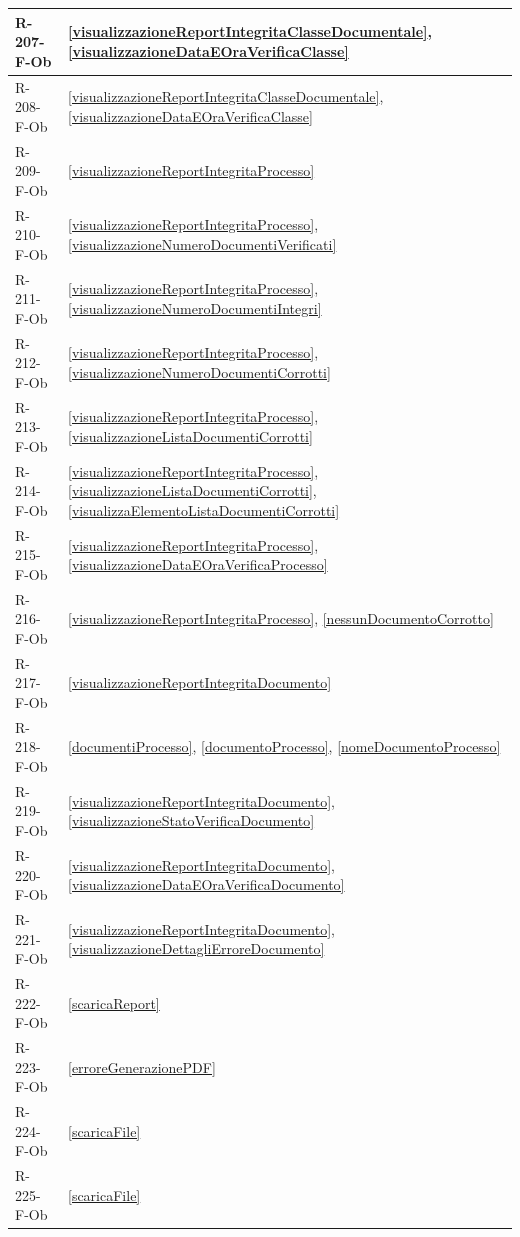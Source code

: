 \begin{longtable}{|p{4cm}|p{10cm}|}
\hline
R-207-F-Ob & \ref{visualizzazioneReportIntegritaClasseDocumentale}, \ref{visualizzazioneDataEOraVerificaClasse} \\
\hline
R-208-F-Ob & \ref{visualizzazioneReportIntegritaClasseDocumentale}, \ref{visualizzazioneDataEOraVerificaClasse} \\
\hline
R-209-F-Ob & \ref{visualizzazioneReportIntegritaProcesso} \\
\hline
R-210-F-Ob & \ref{visualizzazioneReportIntegritaProcesso}, \ref{visualizzazioneNumeroDocumentiVerificati} \\
\hline
R-211-F-Ob & \ref{visualizzazioneReportIntegritaProcesso}, \ref{visualizzazioneNumeroDocumentiIntegri} \\
\hline
R-212-F-Ob & \ref{visualizzazioneReportIntegritaProcesso}, \ref{visualizzazioneNumeroDocumentiCorrotti} \\
\hline
R-213-F-Ob & \ref{visualizzazioneReportIntegritaProcesso}, \ref{visualizzazioneListaDocumentiCorrotti} \\
\hline
R-214-F-Ob & \ref{visualizzazioneReportIntegritaProcesso}, \ref{visualizzazioneListaDocumentiCorrotti}, \ref{visualizzaElementoListaDocumentiCorrotti} \\
\hline
R-215-F-Ob & \ref{visualizzazioneReportIntegritaProcesso}, \ref{visualizzazioneDataEOraVerificaProcesso} \\
\hline
R-216-F-Ob & \ref{visualizzazioneReportIntegritaProcesso}, \ref{nessunDocumentoCorrotto} \\
\hline
R-217-F-Ob & \ref{visualizzazioneReportIntegritaDocumento} \\
\hline
R-218-F-Ob & \ref{documentiProcesso}, \ref{documentoProcesso}, \ref{nomeDocumentoProcesso} \\
\hline
R-219-F-Ob & \ref{visualizzazioneReportIntegritaDocumento}, \ref{visualizzazioneStatoVerificaDocumento} \\
\hline
R-220-F-Ob & \ref{visualizzazioneReportIntegritaDocumento}, \ref{visualizzazioneDataEOraVerificaDocumento} \\
\hline
R-221-F-Ob & \ref{visualizzazioneReportIntegritaDocumento}, \ref{visualizzazioneDettagliErroreDocumento} \\
\hline
R-222-F-Ob & \ref{scaricaReport} \\
\hline
R-223-F-Ob & \ref{erroreGenerazionePDF} \\
\hline
R-224-F-Ob & \ref{scaricaFile} \\
\hline
R-225-F-Ob & \ref{scaricaFile} \\
\hline

\end{longtable}

